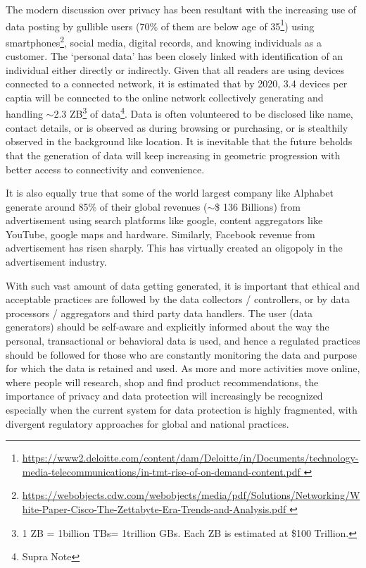 \begin{multicols}{2}
The modern discussion over privacy has been resultant with the increasing use of data posting by gullible users (70\% of them are below age of 35\footnote{\url{https://www2.deloitte.com/content/dam/Deloitte/in/Documents/technology-media-telecommunications/in-tmt-rise-of-on-demand-content.pdf }}) using smartphones\footnote{\url{https://webobjects.cdw.com/webobjects/media/pdf/Solutions/Networking/White-Paper-Cisco-The-Zettabyte-Era-Trends-and-Analysis.pdf }}, social media, digital records, and knowing individuals as a customer. The ‘personal data’ has been closely linked with identification of an individual either directly or indirectly. Given that all readers are using devices connected to a connected network, it is estimated that by 2020, 3.4 devices per captia will be connected to the online network collectively generating and handling $\sim$2.3 ZB\footnote{1 ZB = 1billion TBs= 1trillion GBs. Each ZB is estimated at \$100 Trillion.} of data\footnote{Supra Note}. Data is often volunteered to be disclosed like name, contact details, or is observed as during browsing or purchasing, or is stealthily observed in the background like location. It is inevitable that the future beholds that the generation of data will keep increasing in geometric progression with better access to connectivity and convenience.

It is also equally true that some of the world largest company like Alphabet generate around 85\% of their global revenues ($\sim$\$ 136 Billions) from advertisement using search platforms like google, content aggregators like YouTube, google maps and hardware. Similarly, Facebook revenue from advertisement has risen sharply. This has virtually created an oligopoly in the advertisement industry.

With such vast amount of data getting generated, it is important that ethical and acceptable practices are followed by the data collectors / controllers, or by data processors / aggregators and third party data handlers. The user (data generators) should be self-aware and explicitly informed about the way the personal, transactional or behavioral data is used, and hence a regulated practices should be followed for those who are constantly monitoring the data and purpose for which the data is retained and used. As more and more activities move online, where people will research, shop and find product recommendations, the importance of privacy and data protection will  increasingly be recognized especially when the current system for data protection is highly fragmented, with divergent regulatory approaches for global and national practices. 


\end{multicols}
